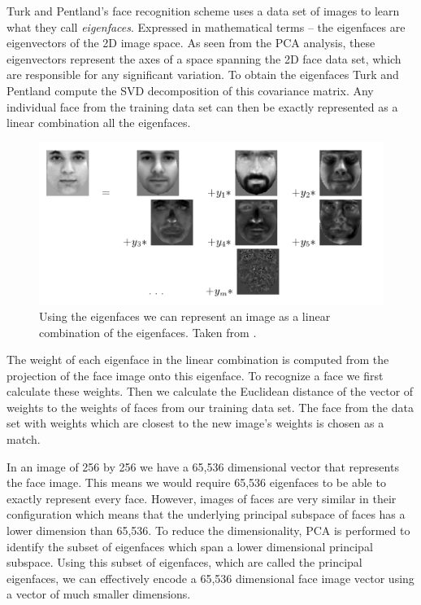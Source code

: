 \documentclass[11pt,a4paper,twoside]{report}
\begin{document}
Turk and Pentland's face recognition
scheme uses a data set of images to learn what they call
\textit{eigenfaces}. Expressed in mathematical terms -- the eigenfaces are eigenvectors of the 2D image
space. As seen from the PCA analysis, these eigenvectors represent the axes of a
space spanning the 2D face data set, which are responsible for any
significant variation. To obtain the eigenfaces Turk and Pentland compute the SVD decomposition of this
covariance matrix. Any individual face from the training data set can then be
exactly represented as a linear combination all the eigenfaces.

\begin{figure}[H]
\centering
\includegraphics[scale=0.65]{images/eigenfaces_comb_from_nn_vienna.png}
\caption{ Using the eigenfaces we can represent an image as a linear combination of the
  eigenfaces. Taken from \cite{vienna}. }
\label{gr:eigenfaces}
\end{figure}

The weight of each eigenface in the linear combination is computed from the
projection of the face image onto this eigenface. To recognize a face we
 first calculate these weights. Then we calculate the Euclidean distance of the vector
of weights to the weights of faces from our training data set. The face from
the data set with weights which are closest to the new image's weights is chosen
as a match.

In an image of 256 by 256 we have a 65,536 dimensional vector that
represents the face image. This means we would require 65,536 eigenfaces to be
able to exactly represent every face. However, images of faces are very similar
in their configuration which means that the underlying principal subspace of
faces has a lower dimension than 65,536. To reduce the dimensionality, PCA is
performed to identify the subset of eigenfaces which span a lower dimensional principal
subspace. Using this subset of eigenfaces, which are called the principal
eigenfaces, we can effectively encode a 65,536 dimensional face image vector using a vector of much smaller
dimensions.
\end{document}
